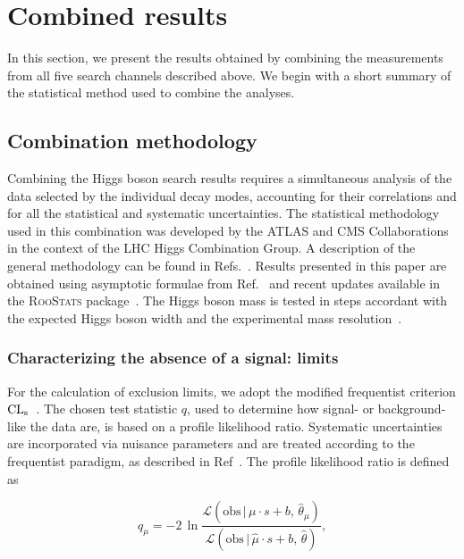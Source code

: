 \documentclass[12pt,twoside,a4paper,cmspaper,final,collab]{cms-tdr}
\begin{document}
\section{Combined results}\label{sec:results}

In this section, we present the results obtained by combining the measurements  from all
five search channels described above.
We begin with a short summary of the statistical method used to combine
the analyses.

\subsection{Combination methodology}
\label{sec:method}
Combining the Higgs boson search results
requires a simultaneous analysis of the data selected by the individual decay modes,
accounting for their correlations and for all the statistical and systematic uncertainties.
The statistical methodology used in this combination was developed
by the ATLAS and CMS Collaborations in the context of the LHC Higgs Combination Group.
A description of the general methodology can be found in Refs.~\cite{LHC-HCG-Report, Chatrchyan:2012tx}.
Results presented in this paper are obtained using asymptotic formulae from Ref.~\cite{Cowan:2010st}
and recent updates available in the \textsc{RooStats} package~\cite{RooStats}.
The Higgs boson mass is tested in steps accordant with the expected Higgs boson width %
and the experimental mass resolution~\cite{LHC-HCG-Report}.

\subsubsection{Characterizing the absence of a signal: limits}

For the calculation of exclusion limits, we adopt the modified frequentist
criterion $\mathrm{CL_s}$~\cite{Junk:1999kv,Read1}. The chosen test statistic $q$, used to determine
how signal- or background-like the data are, is based on a  profile likelihood ratio.
Systematic uncertainties are incorporated via nuisance parameters and
are treated according to the frequentist paradigm, as described in Ref~\cite{LHC-HCG-Report}.
The profile likelihood ratio is defined as

\begin{equation}
q_{\mu} = - 2 \, \ln \frac {\mathcal{L}(\mathrm{obs} \, | \, \mu \cdot s + b, \, \hat \theta_{\mu} ) }
                           {\mathcal{L}(\mathrm{obs} \, | \, \hat \mu \cdot s + b, \, \hat \theta ) } ,
\end{equation}
\end{document}
